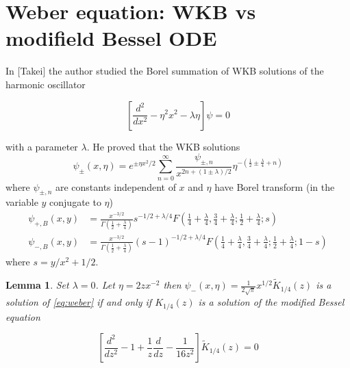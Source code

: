 \documentclass{article}
\theoremstyle{definition}
\theoremstyle{plain}
\newtheorem{lemma}{Lemma}
\begin{document}
\section{Weber equation: WKB vs modifield Bessel ODE}

In [Takei] the author studied the Borel summation of WKB solutions of the harmonic oscillator 

\begin{equation}\label{eq:weber}
\left[\frac{d^2}{dx^2}-\eta^2x^2-\lambda\eta\right]\psi=0
\end{equation}

with a parameter $\lambda$. He proved that the WKB solutions
\begin{equation}
\psi_{\pm}(x,\eta)=e^{\pm\eta x^2/2}\sum_{n=0}^{\infty}\frac{\psi_{\pm,n}}{x^{2n+(1\pm\lambda)/2}}\eta^{-\left(\frac{1}{2}\pm\frac{\lambda}{4}+n\right)}
\end{equation}
 where $\psi_{\pm,n}$ are constants independent of $x$ and $\eta$ have Borel transform (in the variable $y$ conjugate to $\eta$) 
 \begin{align}
 \psi_{+,B}(x,y)&=\frac{x^{-3/2}}{\Gamma\left(\frac{1}{2}+\frac{\lambda}{4}\right)}s^{-1/2+\lambda/4} F\left(\frac{1}{4}+\frac{\lambda}{4},\frac{3}{4}+\frac{\lambda}{4};\frac{1}{2}+\frac{\lambda}{4};s\right)\\
 \psi_{-,B}(x,y)&=\frac{x^{-3/2}}{\Gamma\left(\frac{1}{2}+\frac{\lambda}{4}\right)}(s-1)^{-1/2+\lambda/4} F\left(\frac{1}{4}+\frac{\lambda}{4},\frac{3}{4}+\frac{\lambda}{4};\frac{1}{2}+\frac{\lambda}{4};1-s\right)
 \end{align}
where $s=y/x^2+1/2$. 

\begin{lemma}
Set $\lambda=0$. Let $\eta=2zx^{-2}$ then $\psi_-(x,\eta)=\frac{1}{2\sqrt{\pi}}x^{1/2}\tilde{K}_{1/4}(z)$ is a solution of \eqref{eq:weber} if and only if $K_{1/4}(z)$ is a solution of the modified Bessel equation

\begin{equation}
\left[\frac{d^2}{dz^2}-1+\frac{1}{z}\frac{d}{dz}-\frac{1}{16 z^2}\right]\tilde{K}_{1/4}(z)=0
\end{equation}

\end{lemma}
\end{document}
